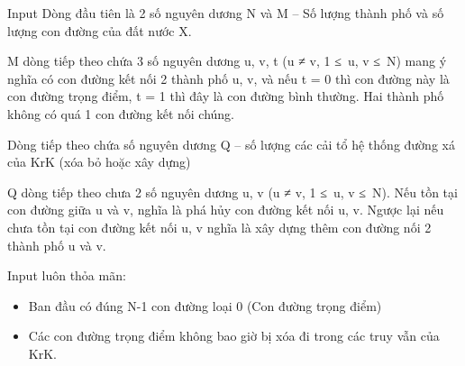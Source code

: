 Input  
Dòng đầu tiên là 2 số nguyên dương N và M – Số lượng thành phố và số lượng con đường của đất nước X.  

   M dòng tiếp theo chứa 3 số nguyên dương u, v, t (u ≠ v, 1 ≤ u, v ≤ N) mang ý nghĩa có con đường kết nối 2 thành phố u, v, và nếu t = 0 thì con đường này là con đường trọng điểm, t = 1 thì đây là con đường bình thường. Hai thành phố không có quá 1 con đường kết nối chúng.  

   Dòng tiếp theo chứa số nguyên dương Q – số lượng các cải tổ hệ thống đường xá của KrK (xóa bỏ hoặc xây dựng)  

   Q dòng tiếp theo chưa 2 số nguyên dương u, v (u ≠ v, 1 ≤ u, v ≤ N). Nếu tồn tại con đường giữa u và v, nghĩa là phá hủy con đường kết nối u, v. Ngược lại nếu chưa tồn tại con đường kết nối u, v nghĩa là xây dựng thêm con đường nối 2 thành phố u và v.  

   Input luôn thỏa mãn:  
\begin{itemize}
	\item     Ban đầu có đúng N-1 con đường loại 0 (Con đường trọng điểm)   
	\item     Các con đường trọng điểm không bao giờ bị xóa đi trong các truy vẫn của KrK.   
\end{itemize}